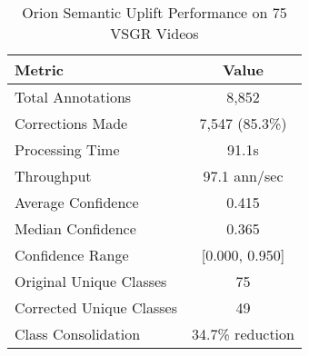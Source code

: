 \begin{table}[t]
\centering
\caption{Orion Semantic Uplift Performance on 75 VSGR Videos}
\label{tab:semantic_uplift}
\begin{tabular}{lc}
\toprule
\textbf{Metric} & \textbf{Value} \\
\midrule
Total Annotations & 8,852 \\
Corrections Made & 7,547 (85.3\%) \\
Processing Time & 91.1s \\
Throughput & 97.1 ann/sec \\
\midrule
Average Confidence & 0.415 \\
Median Confidence & 0.365 \\
Confidence Range & [0.000, 0.950] \\
\midrule
Original Unique Classes & 75 \\
Corrected Unique Classes & 49 \\
Class Consolidation & 34.7\% reduction \\
\bottomrule
\end{tabular}
\end{table}
